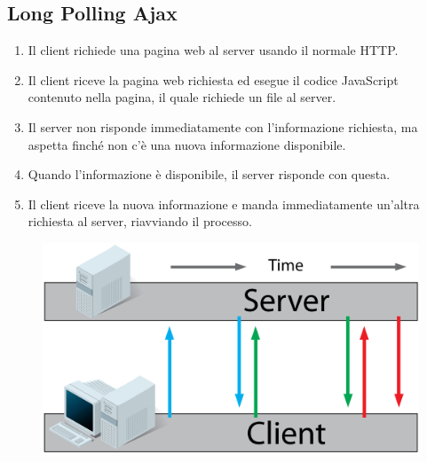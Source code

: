 \subsection{Long Polling Ajax}
\begin{enumerate}
	\item Il client richiede una pagina web al server usando il normale HTTP.
	\item Il client riceve la pagina web richiesta ed esegue il codice JavaScript contenuto nella pagina, il quale richiede un file al server.
	\item Il server non risponde immediatamente con l'informazione richiesta, ma aspetta finché non c'è una nuova informazione disponibile.
	\item Quando l'informazione è disponibile, il server risponde con questa.
	\item Il client riceve la nuova informazione e manda immediatamente un'altra richiesta al server, riavviando il processo.
\end{enumerate}
\begin{figure}[h]
	\centering
	\includegraphics[scale=0.4]{Immagini/ajax_long_polling.png}
\end{figure}
